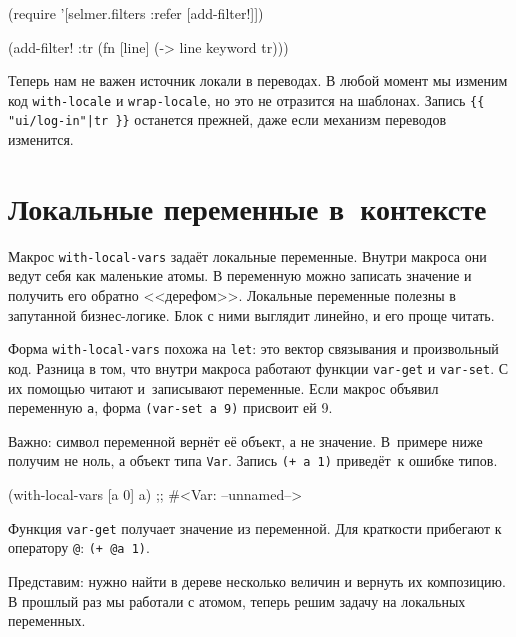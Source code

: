 \else

\begin{english}
  \begin{clojure}
(require '[selmer.filters :refer [add-filter!]])

(add-filter! :tr
 (fn [line]
   (-> line keyword tr)))
  \end{clojure}
\end{english}

\fi

Теперь нам не важен источник локали в переводах. В любой момент мы изменим код
\verb|with-locale| и \verb|wrap-locale|, но это не отразится на
шаблонах. Запись \verb={{ "ui/log-in"|tr }}= останется прежней, даже если
механизм переводов изменится.

\section{Локальные переменные в~контексте}


Макрос \verb|with-local-vars| задаёт локальные переменные. Внутри макроса они
ведут себя как маленькие атомы. В переменную можно записать значение и получить
его обратно <<дерефом>>. Локальные переменные полезны в запутанной
бизнес-логике. Блок с ними выглядит линейно, и его проще читать.

Форма \verb|with-local-vars| похожа на \verb|let|: это вектор связывания и
произвольный код. Разница в том, что внутри макроса работают функции
\verb|var-get| и \verb|var-set|. С их помощью читают и~записывают
переменные. Если макрос объявил переменную \verb|a|, форма \verb|(var-set a 9)|
присвоит ей 9.

Важно: символ переменной вернёт её объект, а не значение. В~примере ниже получим
не ноль, а объект типа \verb|Var|. Запись \verb|(+ a 1)| приведёт~к ошибке
типов.

\begin{english}
  \begin{clojure}
(with-local-vars [a 0] a)
;; #<Var: --unnamed-->
  \end{clojure}
\end{english}

Функция \verb|var-get| получает значение из переменной. Для краткости
прибегают к оператору \verb|@|: \verb|(+ @a 1)|.

Представим: нужно найти в дереве несколько величин и вернуть их композицию. В
прошлый раз мы работали с атомом, теперь решим задачу на локальных переменных.

